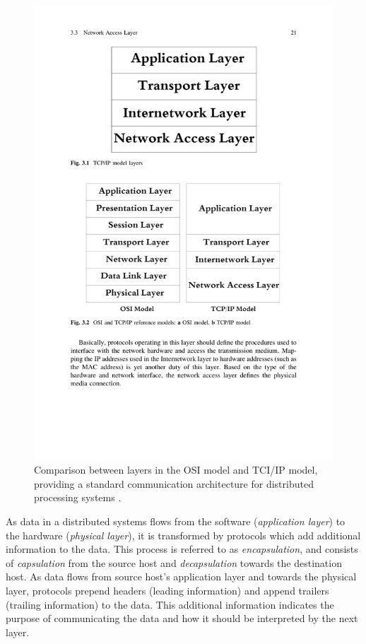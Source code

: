 \documentclass[../report.tex]{subfiles}
\begin{document}
\begin{figure}[h!]
\centering
\includegraphics[width=0.8\linewidth]{figures/ositcilayers.pdf}
\caption{Comparison between layers in the OSI model and TCI/IP model, providing a standard communication architecture for distributed processing systems \cite[21]{alani2014guide}.}
\label{fig:ositcilayers}
\end{figure}

As data in a distributed systems flows from the software (\textit{application layer}) to the hardware (\textit{physical layer}), it is transformed by protocols which add additional information to the data. This process is referred to as \textit{encapsulation}, and consists of \textit{capsulation} from the source host and \textit{decapsulation} towards the destination host. As data flows from source host's application layer and towards the physical layer, protocols prepend headers (leading information) and append trailers (trailing information) to the data. This additional information indicates the purpose of communicating the data and how it should be interpreted by the next layer. \\
\end{document}
